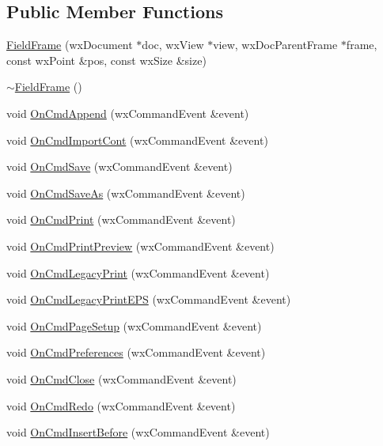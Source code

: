 \subsection*{Public Member Functions}
\begin{DoxyCompactItemize}
\item 
\hyperlink{a00102_a8a97aa0e59d425046ecb4b5e835a80f5}{Field\-Frame} (wx\-Document $\ast$doc, wx\-View $\ast$view, wx\-Doc\-Parent\-Frame $\ast$frame, const wx\-Point \&pos, const wx\-Size \&size)
\item 
\hyperlink{a00102_aafd7bf2fca6a406379294cefa0b9ac86}{$\sim$\-Field\-Frame} ()
\item 
void \hyperlink{a00102_aba9da6da89502a548f569d561c0877a4}{On\-Cmd\-Append} (wx\-Command\-Event \&event)
\item 
void \hyperlink{a00102_a8322a93deaccc86493a7f27c9afbec8d}{On\-Cmd\-Import\-Cont} (wx\-Command\-Event \&event)
\item 
void \hyperlink{a00102_a9671be48a7f4eaaf691e9f488d8b7fde}{On\-Cmd\-Save} (wx\-Command\-Event \&event)
\item 
void \hyperlink{a00102_ae387142c4905dec052636980cab4d1a8}{On\-Cmd\-Save\-As} (wx\-Command\-Event \&event)
\item 
void \hyperlink{a00102_a486f472698d11b3bc1665137aa609dfe}{On\-Cmd\-Print} (wx\-Command\-Event \&event)
\item 
void \hyperlink{a00102_a1b7e9b6495bee37cd360f448094f952a}{On\-Cmd\-Print\-Preview} (wx\-Command\-Event \&event)
\item 
void \hyperlink{a00102_a75b7ac0c10c38850d99d001440d083a0}{On\-Cmd\-Legacy\-Print} (wx\-Command\-Event \&event)
\item 
void \hyperlink{a00102_a80515828c35d04649508d632b3b21668}{On\-Cmd\-Legacy\-Print\-E\-P\-S} (wx\-Command\-Event \&event)
\item 
void \hyperlink{a00102_a7e4237e19539c993550a6791b5465b30}{On\-Cmd\-Page\-Setup} (wx\-Command\-Event \&event)
\item 
void \hyperlink{a00102_adaecd4af8c0f91b755499bc776e942c9}{On\-Cmd\-Preferences} (wx\-Command\-Event \&event)
\item 
void \hyperlink{a00102_a37fa9fc79aa0b36b28eb502061282976}{On\-Cmd\-Close} (wx\-Command\-Event \&event)
\item 
void \hyperlink{a00102_ad471336d658697598ea27b61b88cfac9}{On\-Cmd\-Redo} (wx\-Command\-Event \&event)
\item 
void \hyperlink{a00102_ad865089b8401479b0df32a0e8b288331}{On\-Cmd\-Insert\-Before} (wx\-Command\-Event \&event)

\end{DoxyCompactItemize}
